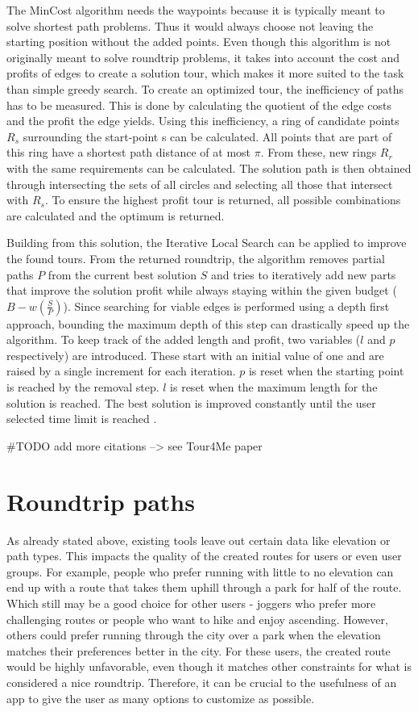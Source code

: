 The MinCost algorithm needs the waypoints because it is typically meant to solve shortest path problems. 
Thus it would always choose not leaving the starting position without the added points. 
Even though this algorithm is not originally meant to solve roundtrip problems, it takes into account the cost and profits of edges to create a solution tour, which makes it more suited to the task than simple greedy search.
To create an optimized tour, the inefficiency of paths has to be measured. 
This is done by calculating the quotient of the edge costs and the profit the edge yields. 
Using this inefficiency, a ring of candidate points $R_s$ surrounding the start-point s can be calculated.
All points that are part of this ring have a shortest path distance of at most $\pi$.
From these, new rings $R_r$ with the same requirements can be calculated. 
The solution path is then obtained through intersecting the sets of all circles and selecting all those that intersect with $R_s$.
To ensure the highest profit tour is returned, all possible combinations are calculated and the optimum is returned\cite{buchinTour4MeFrameworkCustomized2022a}.

Building from this solution, the Iterative Local Search can be applied to improve the found tours.
From the returned roundtrip, the algorithm removes partial paths $P$ from the current best solution $S$ and tries to iteratively add new parts that improve the solution profit while always staying within the given budget ($B-w(\frac{S}{P})$).
Since searching for viable edges is performed using a depth first approach, bounding the maximum depth of this step can drastically speed up the algorithm.
To keep track of the added length and profit, two variables ($l$ and $p$ respectively) are introduced.
These start with an initial value of one and are raised by a single increment for each iteration.
$p$ is reset when the starting point is reached by the removal step.
$l$ is reset when the maximum length for the solution is reached.
The best solution is improved constantly until the user selected time limit is reached \cite{buchinTour4MeFrameworkCustomized2022a}.

\#TODO add more citations --> see Tour4Me paper

\section{Roundtrip paths}
\label{sec:Roudtrip}
As already stated above, existing tools leave out certain data like elevation or path types.
This impacts the quality of the created routes for users or even user groups. 
For example, people who prefer running with little to no elevation can end up with a route that takes them uphill through a park for half of the route.
Which still may be a good choice for other users - joggers who prefer more challenging routes or people who want to hike and enjoy ascending.
However, others could prefer running through the city over a park when the elevation matches their preferences better in the city.
For these users, the created route would be highly unfavorable, even though it matches other constraints for what is considered a nice roundtrip.
Therefore, it can be crucial to the usefulness of an app to give the user as many options to customize as possible. 


